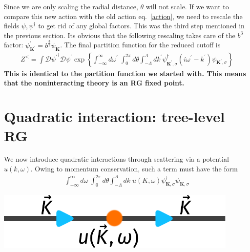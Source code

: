 \documentclass{article}
\begin{document}
Since we are only scaling the radial distance, \(\theta\) will not scale. If we want to compare this new action with the old action eq.~\ref{action}, we need to rescale the fields \(\psi,\psi^\dagger\) to get rid of any global factors. This was the third step mentioned in the previous section. Its obvious that the following rescaling takes care of the \(b^3\) factor: \(\psi^\prime_{\mathbf{K}^\prime} = b^{\frac{3}{2}}\psi_\mathbf{K}\). The final partition function for the reduced cutoff is
\begin{equation}\begin{aligned}
	Z^< = \int \mathcal{D}{\psi^\prime}^\dagger \mathcal{D}{\psi^\prime}\exp\left\{\int_{-\infty}^\infty d\omega^\prime\;\int_0^{2\pi} d\theta \int_{-\Lambda}^{\Lambda}dk^\prime\psi_{\mathbf K^\prime,\sigma}^\dagger \left(i\omega^\prime - k^\prime\right)\psi_{\mathbf K^\prime,\sigma}\right\}
\end{aligned}\end{equation}
\textbf{This is identical to the partition function we started with. This means that the noninteracting theory is an RG fixed point.}
\section{Quadratic interaction: tree-level RG}
\begin{minipage}{0.55\textwidth}
We now introduce quadratic interactions through scattering via a potential \(u(k,\omega)\). Owing to momentum conservation, such a term must have the form
\begin{equation}\begin{aligned}
	\int_{-\infty}^\infty d\omega\;\int_0^{2\pi} d\theta \int_{-\Lambda}^{\Lambda}dk \;u(K,\omega)\psi_{\mathbf{K},\sigma}^\dagger\psi_{\mathbf{K},\sigma}
\end{aligned}\end{equation}
\end{minipage}
\hspace*{\fill}
\begin{minipage}{0.3\textwidth}
	\centering
	\includegraphics[width=0.9\textwidth]{./figures/tree_quadratic.pdf}
\end{minipage}
\end{document}
